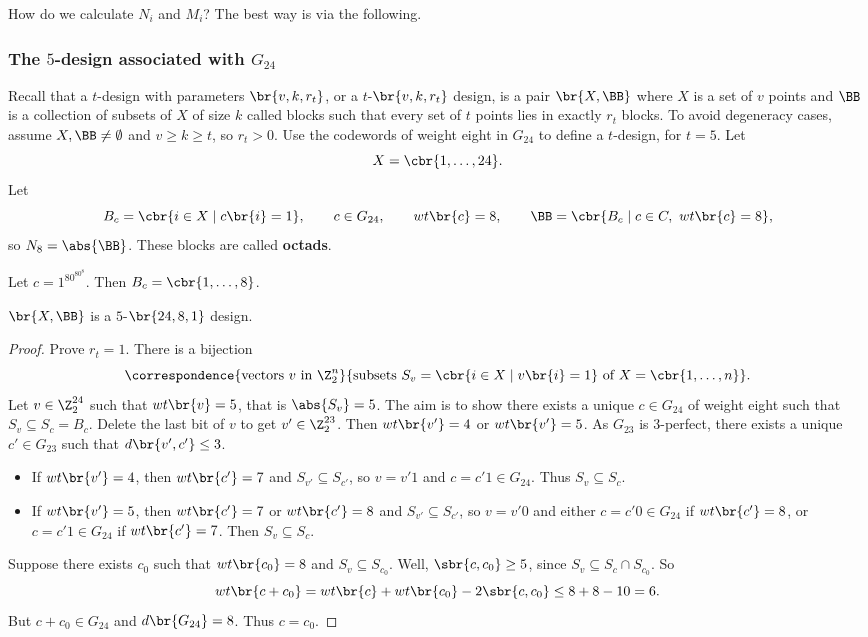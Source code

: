 How do we calculate $ N_i $ and $ M_i $? The best way is via the following.

\subsubsection{The $ 5 $-design associated with $ G_{24} $}

Recall that a $ t $-design with parameters $ \br{v, k, r_t} $, or a $ t $-$ \br{v, k, r_t} $ design, is a pair $ \br{X, \BB} $ where $ X $ is a set of $ v $ points and $ \BB $ is a collection of subsets of $ X $ of size $ k $ called blocks such that every set of $ t $ points lies in exactly $ r_t $ blocks. To avoid degeneracy cases, assume $ X, \BB \ne \emptyset $ and $ v \ge k \ge t $, so $ r_t > 0 $. Use the codewords of weight eight in $ G_{24} $ to define a $ t $-design, for $ t = 5 $. Let
$$ X = \cbr{1, \dots, 24}. $$
Let
$$ B_c = \cbr{i \in X \mid c\br{i} = 1}, \qquad c \in G_{24}, \qquad wt\br{c} = 8, \qquad \BB = \cbr{B_c \mid c \in C, \ wt\br{c} = 8}, $$
so $ N_8 = \abs{\BB} $. These blocks are called \textbf{octads}.

\begin{example*}
Let $ c = 1^80^80^8 $. Then $ B_c = \cbr{1, \dots, 8} $.
\end{example*}

\pagebreak

\begin{theorem}
$ \br{X, \BB} $ is a $ 5 $-$ \br{24, 8, 1} $ design.
\end{theorem}


\begin{proof}
Prove $ r_t = 1 $. There is a bijection
$$ \correspondence{\text{vectors} \ v \ \text{in} \ \Z_2^n}{\text{subsets} \ S_v = \cbr{i \in X \mid v\br{i} = 1} \ \text{of} \ X = \cbr{1, \dots, n}}. $$
Let $ v \in \Z_2^{24} $ such that $ wt\br{v} = 5 $, that is $ \abs{S_v} = 5 $. The aim is to show there exists a unique $ c \in G_{24} $ of weight eight such that $ S_v \subseteq S_c = B_c $. Delete the last bit of $ v $ to get $ v' \in \Z_2^{23} $. Then $ wt\br{v'} = 4 $ or $ wt\br{v'} = 5 $. As $ G_{23} $ is $ 3 $-perfect, there exists a unique $ c' \in G_{23} $ such that $ d\br{v', c'} \le 3 $.
\begin{itemize}
\item If $ wt\br{v'} = 4 $, then $ wt\br{c'} = 7 $ and $ S_{v'} \subseteq S_{c'} $, so $ v = v'1 $ and $ c = c'1 \in G_{24} $. Thus $ S_v \subseteq S_c $.
\item If $ wt\br{v'} = 5 $, then $ wt\br{c'} = 7 $ or $ wt\br{c'} = 8 $ and $ S_{v'} \subseteq S_{c'} $, so $ v = v'0 $ and either $ c = c'0 \in G_{24} $ if $ wt\br{c'} = 8 $, or $ c = c'1 \in G_{24} $ if $ wt\br{c'} = 7 $. Then $ S_v \subseteq S_c $.
\end{itemize}
Suppose there exists $ c_0 $ such that $ wt\br{c_0} = 8 $ and $ S_v \subseteq S_{c_0} $. Well, $ \sbr{c, c_0} \ge 5 $, since $ S_v \subseteq S_c \cap S_{c_0} $. So
$$ wt\br{c + c_0} = wt\br{c} + wt\br{c_0} - 2\sbr{c, c_0} \le 8 + 8 - 10 = 6. $$
But $ c + c_0 \in G_{24} $ and $ d\br{G_{24}} = 8 $. Thus $ c = c_0 $.
\end{proof}

